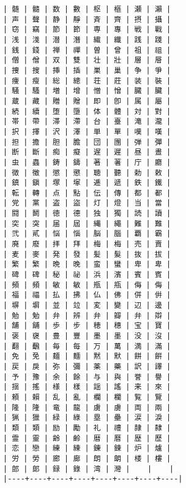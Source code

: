\documentclass[11pt,a4j,titlepage]{jarticle}
\begin{document}
\begin{verbatim}
| 髄 | 髓 | 数 | 數 | 枢 | 樞 | 瀬 | 瀨 |
| 声 | 聲 | 静 | 靜 | 斉 | 齊 | 摂 | 攝 |
| 窃 | 竊 | 節 | 節 | 専 | 專 | 戦 | 戰 |
| 浅 | 淺 | 潜 | 潛 | 繊 | 纖 | 践 | 踐 |
| 銭 | 錢 | 禅 | 禪 | 曽 | 曾 | 祖 | 祖 |
| 僧 | 僧 | 双 | 雙 | 壮 | 壯 | 層 | 層 |
| 捜 | 搜 | 挿 | 插 | 巣 | 巢 | 争 | 爭 |
| 痩 | 瘦 | 総 | 總 | 荘 | 莊 | 装 | 裝 |
| 騒 | 騷 | 増 | 增 | 憎 | 憎 | 臓 | 臟 |
| 蔵 | 藏 | 贈 | 贈 | 即 | 卽 | 属 | 屬 |
| 続 | 續 | 堕 | 墮 | 体 | 體 | 対 | 對 |
| 帯 | 帶 | 滞 | 滯 | 台 | 臺 | 滝 | 瀧 |
| 択 | 擇 | 沢 | 澤 | 単 | 單 | 嘆 | 嘆 |
| 担 | 擔 | 胆 | 膽 | 団 | 團 | 弾 | 彈 |
| 断 | 斷 | 痴 | 癡 | 遅 | 遲 | 昼 | 晝 |
| 虫 | 蟲 | 鋳 | 鑄 | 著 | 著 | 庁 | 廳 |
| 徴 | 徵 | 懲 | 懲 | 聴 | 聽 | 勅 | 敕 |
| 鎮 | 鎭 | 塚 | 塚 | 逓 | 遞 | 鉄 | 鐵 |
| 転 | 轉 | 点 | 點 | 伝 | 傳 | 都 | 都 |
| 党 | 黨 | 盗 | 盜 | 灯 | 燈 | 当 | 當 |
| 闘 | 鬭 | 徳 | 德 | 独 | 獨 | 読 | 讀 |
| 突 | 突 | 届 | 屆 | 縄 | 繩 | 難 | 難 |
| 弐 | 貳 | 悩 | 惱 | 脳 | 腦 | 覇 | 霸 |
| 廃 | 廢 | 拝 | 拜 | 梅 | 梅 | 売 | 賣 |
| 麦 | 麥 | 発 | 發 | 髪 | 髮 | 抜 | 拔 |
| 繁 | 繁 | 晩 | 晚 | 蛮 | 蠻 | 卑 | 卑 |
| 碑 | 碑 | 秘 | 祕 | 浜 | 濱 | 賓 | 賓 |
| 頻 | 頻 | 敏 | 敏 | 瓶 | 甁 | 侮 | 侮 |
| 福 | 福 | 払 | 拂 | 仏 | 佛 | 併 | 倂 |
| 塀 | 塀 | 並 | 竝 | 変 | 變 | 辺 | 邊 |
| 勉 | 勉 | 弁 | 辨 | 弁 | 瓣 | 弁 | 辯 |
| 舗 | 舖 | 歩 | 步 | 穂 | 穗 | 宝 | 寶 |
| 褒 | 襃 | 豊 | 豐 | 墨 | 墨 | 没 | 沒 |
| 翻 | 飜 | 毎 | 每 | 万 | 萬 | 満 | 滿 |
| 免 | 免 | 麺 | 麵 | 黙 | 默 | 餅 | 餠 |
| 戻 | 戾 | 弥 | 彌 | 薬 | 藥 | 訳 | 譯 |
| 予 | 豫 | 余 | 餘 | 与 | 與 | 誉 | 譽 |
| 揺 | 搖 | 様 | 樣 | 謡 | 謠 | 来 | 來 |
| 頼 | 賴 | 乱 | 亂 | 欄 | 欄 | 覧 | 覽 |
| 隆 | 隆 | 竜 | 龍 | 虜 | 虜 | 両 | 兩 |
| 猟 | 獵 | 緑 | 綠 | 塁 | 壘 | 涙 | 淚 |
| 類 | 類 | 励 | 勵 | 礼 | 禮 | 隷 | 隸 |
| 霊 | 靈 | 齢 | 齡 | 暦 | 曆 | 歴 | 歷 |
| 恋 | 戀 | 練 | 練 | 錬 | 鍊 | 炉 | 爐 |
| 労 | 勞 | 廊 | 廊 | 朗 | 朗 | 楼 | 樓 |
| 郎 | 郞 | 録 | 錄 | 湾 | 灣 |    |    |
|----+----+----+----+----+----+----+----|


\end{verbatim}
\end{document}
